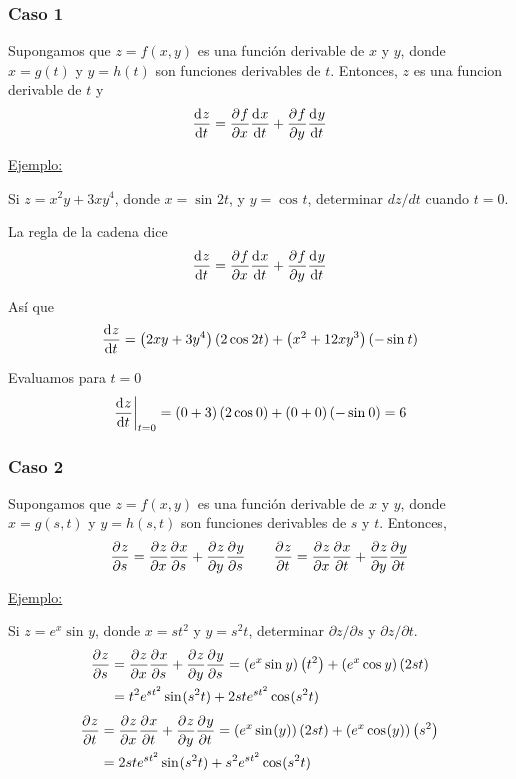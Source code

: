 \documentclass[12pt]{article}
\begin{document}
\subsubsection{Caso 1}
Supongamos que $ z=f(x,y) $ es una función derivable de $ x $ y $ y $, donde $ x=g(t) $ y $ y=h(t) $ son funciones derivables de $ t $. Entonces, $ z $ es una funcion derivable de $ t $ y
\[
\dv[]{z}{t} = \pdv[]{f}{x}\dv[]{x}{t} + \pdv[]{f}{y}\dv[]{y}{t}
\]

\underline{Ejemplo:}

Si $ z=x^2y + 3xy^4 $, donde $ x=\sin^{}2t $, y $ y=\cos^{}t $, determinar $ dz/dt $ cuando $ t=0 $.

La regla de la cadena dice
\[
\dv[]{z}{t} = \pdv[]{f}{x}\dv[]{x}{t} + \pdv[]{f}{y}\dv[]{y}{t}
\]

Así que 
\[
\dv[]{z}{t} = \left(2xy + 3y^4\right)\left(2\cos^{}2t\right) + \left(x^2+12xy^3\right)\left(-\sin^{}t\right)
\]

Evaluamos para $ t=0 $
\[
	\left.\dv[]{z}{t}\right|_{t=0}=\left(0+3\right)\left(2\cos^{}0\right) + \left(0 + 0\right)\left(-\sin^{}0\right) = 6
\]

\subsubsection{Caso 2}
Supongamos que $ z=f(x,y) $ es una función derivable de $ x $ y $ y $, donde $ x=g(s,t) $ y $ y=h(s,t) $ son funciones derivables de $ s $ y $ t $. Entonces,
\[
\pdv[]{z}{s} = \pdv[]{z}{x}\pdv[]{x}{s} + \pdv[]{z}{y}\pdv[]{y}{s} \qquad \pdv[]{z}{t} = \pdv[]{z}{x}\pdv[]{x}{t} + \pdv[]{z}{y}\pdv[]{y}{t}
\]

\underline{Ejemplo:}

Si $ z=e^{x}\sin^{}y $, donde $ x=st^{2} $ y $ y=s^2t $, determinar $ \partial z/\partial s $ y $ \partial z/\partial t $.
\begin{align*}
  \pdv[]{z}{s} &= \pdv[]{z}{x}\pdv[]{x}{s} + \pdv[]{z}{y}\pdv[]{y}{s} = \left(e^{x}\sin^{}y\right)\left(t^{2}\right) + \left(e^x\cos^{}y\right)\left(2st\right)\\
   &= t^2e^{st^2}\sin^{}(s^2t) + 2ste^{st^2}\cos^{}(s^2t)
\end{align*}
\begin{align*}
  \pdv[]{z}{t} &= \pdv[]{z}{x}\pdv[]{x}{t} + \pdv[]{z}{y}\pdv[]{y}{t} = \left(e^x\sin^{}(y)\right)\left(2st\right) + \left(e^x\cos^{}(y)\right)\left(s^2\right)\\
   &= 2ste^{st^2}\sin^{}(s^2t)+s^2e^{st^2}\cos^{}(s^2t)
\end{align*}
\end{document}
